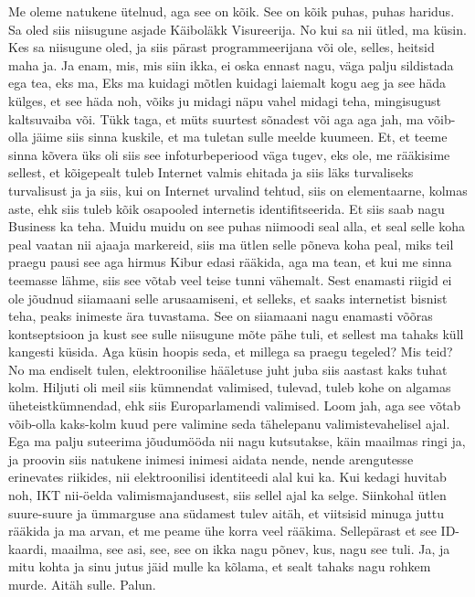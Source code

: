 Me oleme natukene ütelnud, aga see on kõik. See on kõik puhas, puhas haridus.
Sa oled siis niisugune asjade
Käiboläkk Visureerija. No kui sa nii ütled, ma küsin. Kes sa niisugune oled, ja siis pärast programmeerijana või ole, selles, heitsid maha ja.
Ja enam, mis, mis siin ikka, ei oska ennast nagu, väga palju sildistada ega tea, eks ma, Eks ma kuidagi mõtlen kuidagi laiemalt kogu aeg ja see häda külges, et see häda noh, võiks ju midagi näpu vahel midagi teha, mingisugust kaltsuvaiba või.
Tükk taga, et müts suurtest sõnadest või aga aga jah, ma võib-olla jäime siis sinna kuskile, et ma tuletan sulle meelde kuumeen. Et, et teeme sinna kõvera üks oli siis see infoturbeperiood väga tugev, eks ole, me rääkisime sellest, et kõigepealt tuleb Internet valmis ehitada ja siis läks turvaliseks turvalisust ja ja siis, kui on Internet urvalind tehtud, siis on elementaarne, kolmas aste, ehk siis tuleb kõik osapooled internetis identifitseerida. Et siis saab nagu Business ka teha. Muidu muidu on see puhas niimoodi seal alla, et seal selle koha peal vaatan nii ajaaja markereid, siis ma ütlen selle põneva koha peal, miks teil praegu pausi see aga hirmus Kibur edasi rääkida, aga ma tean, et kui me sinna teemasse lähme, siis see võtab veel teise tunni vähemalt. Sest enamasti riigid ei ole jõudnud siiamaani selle arusaamiseni, et selleks, et saaks internetist bisnist teha, peaks inimeste ära tuvastama. See on siiamaani nagu enamasti võõras kontseptsioon ja kust see sulle niisugune mõte pähe tuli, et sellest ma tahaks küll kangesti küsida. Aga küsin hoopis seda, et millega sa praegu tegeled? Mis teid? No ma endiselt tulen, elektroonilise hääletuse juht juba siis aastast kaks tuhat kolm.
Hiljuti oli meil siis kümnendat valimised, tulevad, tuleb kohe on algamas üheteistkümnendad, ehk siis Europarlamendi valimised. Loom jah, aga see võtab võib-olla kaks-kolm kuud pere valimine seda tähelepanu valimistevahelisel ajal. Ega ma palju suteerima jõudumööda nii nagu kutsutakse, käin maailmas ringi ja, ja proovin siis natukene inimesi inimesi aidata nende, nende arengutesse erinevates riikides, nii elektroonilisi identiteedi alal kui ka. Kui kedagi huvitab noh, IKT nii-öelda valimismajandusest, siis sellel ajal ka selge. Siinkohal ütlen suure-suure ja ümmarguse ana südamest tulev aitäh, et viitsisid minuga juttu rääkida ja ma arvan, et me peame ühe korra veel rääkima. Sellepärast et see ID-kaardi, maailma, see asi, see, see on ikka nagu põnev, kus, nagu see tuli. Ja, ja mitu kohta ja sinu jutus jäid mulle ka kõlama, et sealt tahaks nagu rohkem murde. Aitäh sulle. Palun.


